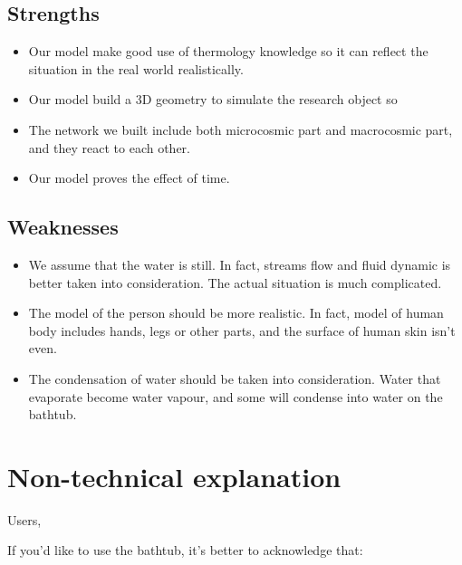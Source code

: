 \documentclass[12pt,a4paper,titlepage]{article}
\begin{document}
\subsection*{Strengths}
\label{sec:strengths}

\begin{itemize}
\item Our model make good use of thermology knowledge so it can reflect the situation in the real world realistically.
\item Our model build a 3D geometry to simulate the research object so
\item The network we built include both microcosmic part and
  macrocosmic part, and they react to each other.
\item Our model proves the effect of time.
\end{itemize}

\subsection*{Weaknesses}
\label{sec:weaknesses}

\begin{itemize}
\item We assume that the water is still. In fact, streams flow and fluid dynamic is better taken into consideration. The actual situation is much complicated.
\item The model of the person should be more realistic. In fact, model of human body includes hands, legs or other parts, and the surface of human skin isn't even.
\item The condensation of water should be taken into consideration. Water that evaporate become water vapour, and some will condense into water on the bathtub.
\end{itemize}


\begin{thebibliography}{99}

\bibitem{}

\end{thebibliography}

\label{LastPage}

\section{Non-technical explanation}

Users,

If you'd like to use the bathtub, it's better to acknowledge that:
\end{document}
